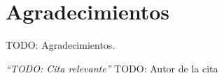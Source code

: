 \chapter*{Agradecimientos}

TODO: Agradecimientos.


\begin{flushright}
\textit{``TODO: Cita relevante''}
TODO: Autor de la cita
\end{flushright}
